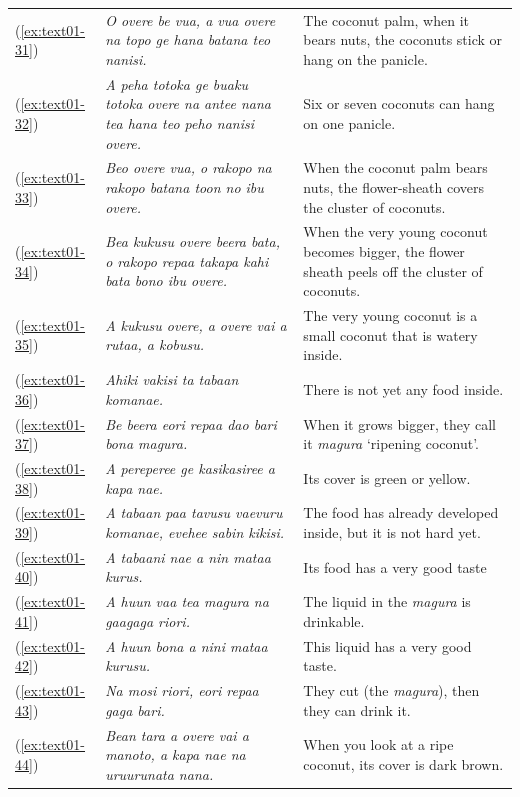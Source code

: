 \documentclass[output=paper]{langscibook}
\begin{document}
\begin{xltabular}{\textwidth}{lXX}
    (\ref{ex:text01-31})&\textit{O overe be vua, a vua overe na topo ge hana batana teo nanisi.}&The coconut palm, when it bears nuts, the coconuts stick or hang on the panicle.\\
    (\ref{ex:text01-32})&\textit{A peha totoka ge buaku totoka overe na antee nana tea hana teo peho nanisi overe.}&Six or seven coconuts can hang on one panicle.\\
    (\ref{ex:text01-33})&\textit{Beo overe vua, o rakopo na rakopo batana toon no ibu overe.}&When the coconut palm bears nuts, the flower-sheath covers the cluster of coconuts.\\
    (\ref{ex:text01-34})&\textit{Bea kukusu overe beera bata, o rakopo repaa takapa kahi bata bono ibu overe.}&When the very young coconut becomes bigger, the flower sheath peels off the cluster of coconuts.\\
    (\ref{ex:text01-35})&\textit{A kukusu overe, a overe vai a rutaa, a kobusu.}&The very young coconut is a small coconut that is watery inside.\\
    (\ref{ex:text01-36})&\textit{Ahiki vakisi ta tabaan komanae.}&There is not yet any food inside.\\
    (\ref{ex:text01-37})&\textit{Be beera eori repaa dao bari bona magura.}&When it grows bigger, they call it \textit{magura} ‘ripening coconut’.\\
    (\ref{ex:text01-38})&\textit{A pereperee ge kasikasiree a kapa nae.}&Its cover is green or yellow.\\
    (\ref{ex:text01-39})&\textit{A tabaan paa tavusu vaevuru komanae, evehee sabin kikisi.}&The food has already developed inside, but it is not hard yet.\\
    (\ref{ex:text01-40})&\textit{A tabaani nae a nin mataa kurus.}&Its food has a very good taste\\
    (\ref{ex:text01-41})&\textit{A huun vaa tea magura na gaagaga riori.}&The liquid in the \textit{magura} is drinkable.\\
    (\ref{ex:text01-42})&\textit{A huun bona a nini mataa kurusu.}&This liquid has a very good taste.\\
    (\ref{ex:text01-43})&\textit{Na mosi riori, eori repaa gaga bari.}&They cut (the \textit{magura}), then they can drink it.\\
    (\ref{ex:text01-44})&\textit{Bean tara a overe vai a manoto, a kapa nae na uruurunata nana.}&When you look at a ripe coconut, its cover is dark brown.\\

\end{xltabular}
\end{document}
